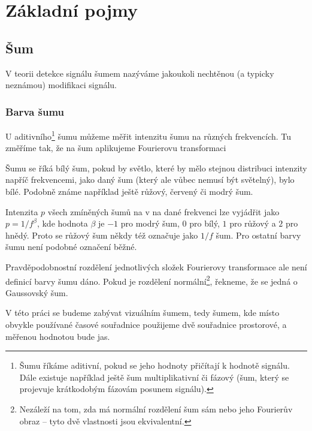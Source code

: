 \chapter{Základní pojmy}

\section{Šum}

V teorii detekce signálu šumem nazýváme jakoukoli nechtěnou (a typicky neznámou) modifikaci signálu.

\subsection{Barva šumu}

U aditivního\footnote{Šumu říkáme aditivní, pokud se jeho hodnoty přičítají k
hodnotě signálu. Dále existuje například ještě šum multiplikativní či fázový
(šum, který se projevuje krátkodobým fázovám posunem signálu).} šumu můžeme
měřit intenzitu šumu na různých frekvencích. Tu změříme tak, že na šum aplikujeme
Fourierovu transformaci

 Šumu se
říká bílý šum, pokud by světlo, které by mělo stejnou distribuci intenzity
napříč frekvencemi, jako daný šum (který ale vůbec nemusí být světelný), bylo
bílé. Podobně známe například ještě růžový, červený či modrý šum.

Intenzita $p$ všech zmíněných šumů na v na dané frekvenci lze vyjádřit jako
$p=1/f^\beta$, kde hodnota $\beta$ je $-1$ pro modrý šum, $0$ pro bílý, $1$ pro
růžový a $2$ pro hnědý. Proto se růžový šum někdy též označuje jako $1/f$ šum. Pro
ostatní barvy šumu není podobné označení běžné.

Pravděpodobnostní rozdělení jednotlivých složek Fourierovy transformace ale
není definicí barvy šumu dáno. Pokud je rozdělení normální\footnote{Nezáleží na
tom, zda má normální rozdělení šum sám nebo jeho Fourierův obraz -- tyto dvě
vlastnosti jsou ekvivalentní.}, řekneme, že se jedná o Gaussovský šum. 

V této práci se budeme zabývat vizuálním šumem, tedy šumem, kde místo obvykle
používané časové souřadnice použijeme dvě souřadnice prostorové, a měřenou
hodnotou bude jas. 

